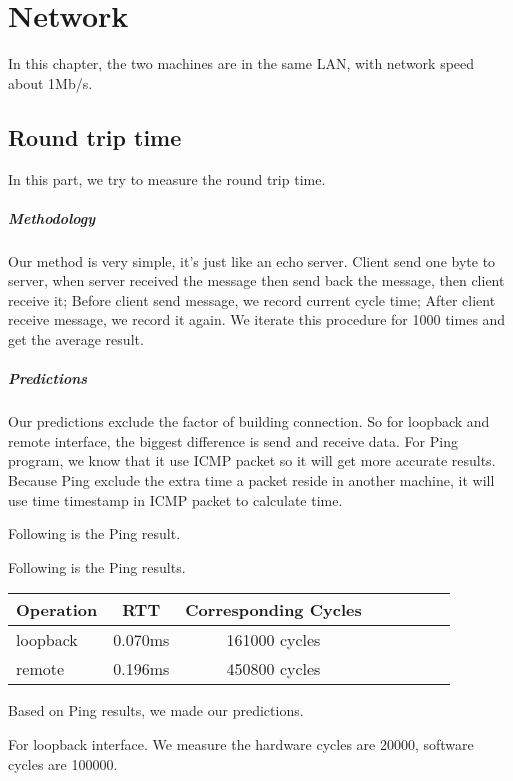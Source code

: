 \chapter{Network}
In this chapter, the two machines are in the same LAN, with network speed about 1Mb/s.

\section{Round trip time}
In this part, we try to measure the round trip time.

\paragraph{Methodology}
Our method is very simple, it's just like an echo server. Client send one byte to server, when server received the message then send back the message, then client receive it;
Before client send message, we record current cycle time; After client receive message, we record it again. We iterate this procedure for 1000 times and get the average result.


\paragraph{Predictions}
Our predictions exclude the factor of building connection. So for loopback and remote interface, the biggest difference is send and receive data.
For Ping program, we know that it use ICMP packet so it will get more accurate results.
Because Ping exclude the extra time a packet reside in another machine, it will use time timestamp in ICMP packet to calculate time.

Following is the Ping result.

Following is the Ping results.
\begin{center}
\begin{tabular}{l*{6}{c}r}
Operation       &  RTT & Corresponding Cycles\\
\hline
loopback & 0.070ms & 161000 cycles\\
remote & 0.196ms &  450800 cycles\\
\end{tabular}
\end{center}

Based on Ping results, we made our predictions.

For loopback interface. We measure the hardware cycles are 20000, software cycles are 100000.

